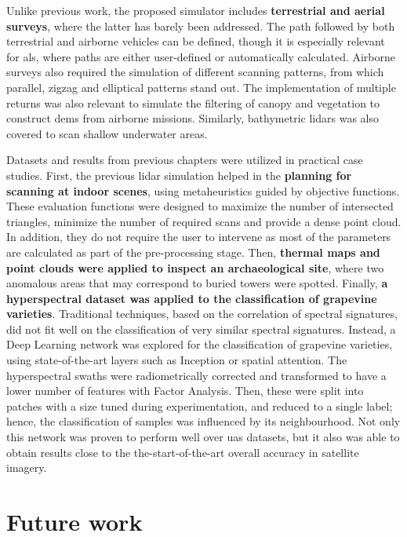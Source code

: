 Unlike previous work, the proposed simulator includes \textbf{terrestrial and aerial surveys}, where the latter has barely been addressed. The path followed by both terrestrial and airborne vehicles can be defined, though it is especially relevant for \acrshort{als}, where paths are either user-defined or automatically calculated. Airborne surveys also required the simulation of different scanning patterns, from which parallel, zigzag and elliptical patterns stand out. The implementation of multiple returns was also relevant to simulate the filtering of canopy and vegetation to construct \acrshort{dem}s from airborne missions. Similarly, bathymetric \acrshort{lidar}s was also covered to scan shallow underwater areas. 

Datasets and results from previous chapters were utilized in practical case studies. First, the previous \acrshort{lidar} simulation helped in the \textbf{planning for scanning at indoor scenes}, using metaheuristics guided by objective functions. These evaluation functions were designed to maximize the number of intersected triangles, minimize the number of required scans and provide a dense point cloud. In addition, they do not require the user to intervene as most of the parameters are calculated as part of the pre-processing stage. Then, \textbf{thermal maps and point clouds were applied to inspect an archaeological site}, where two anomalous areas that may correspond to buried towers were spotted. Finally, \textbf{a hyperspectral dataset was applied to the classification of grapevine varieties}. Traditional techniques, based on the correlation of spectral signatures, did not fit well on the classification of very similar spectral signatures. Instead, a Deep Learning network was explored for the classification of grapevine varieties, using state-of-the-art layers such as Inception or spatial attention. The hyperspectral swaths were radiometrically corrected and transformed to have a lower number of features with Factor Analysis. Then, these were split into patches with a size tuned during experimentation, and reduced to a single label; hence, the classification of samples was influenced by its neighbourhood. Not only this network was proven to perform well over \acrshort{uas} datasets, but it also was able to obtain results close to the the-start-of-the-art overall accuracy in satellite imagery.  

\section{Future work}

